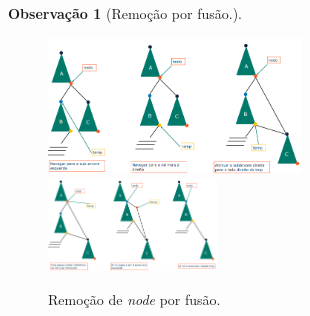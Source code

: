 \documentclass[a4paper, 12pt]{article}
\newtheorem{remark}{Observação}
\begin{document}
\begin{remark}[Remoção por fusão.]
\end{remark}
\begin{figure}[H]
    \centering
    \includegraphics[width=0.6\textwidth]{fig/t/bstRemoveFusion.png}
    \includegraphics[width=0.4\textwidth]{fig/t/bstRemoveFusion2.png}
    \caption{Remoção de \emph{node} por fusão.}
\end{figure}
\end{document}
